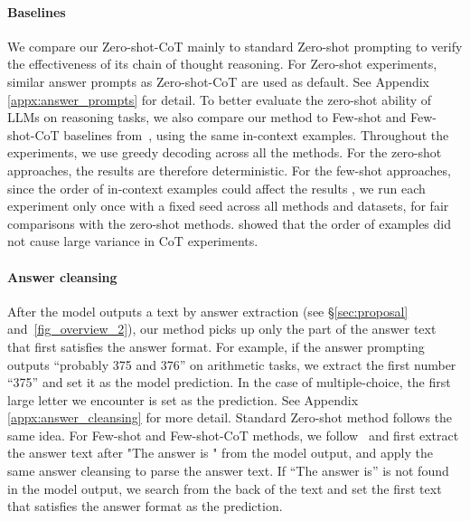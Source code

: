 \documentclass{article}
\newcommand{\kojima}[1]{{\color{red}[{#1} --TK]}}
\newcommand{\CoT}{chain of thought\xspace}
\newcommand{\ours}{Zero-shot-CoT\xspace}
\newcommand{\theirs}{Few-shot-CoT\xspace}
\newcommand{\theirsz}{Zero-shot\xspace}
\newcommand{\theirsf}{Few-shot\xspace}
\newcommand{\mysection}{\S\xspace}
\begin{document}
\paragraph{Baselines}
We compare our \ours mainly to standard \theirsz prompting to verify the effectiveness of its \CoT reasoning. For \theirsz experiments, similar answer prompts as \ours are used as default. See Appendix \ref{appx:answer_prompts} for detail.
To better evaluate the zero-shot ability of LLMs on reasoning tasks, we also compare our method to \theirsf and \theirs baselines from~\citep{cot_wei}, using the same in-context examples. 
Throughout the experiments, we use greedy decoding across all the methods. For the zero-shot approaches, the results are therefore deterministic. 
For the few-shot approaches, since the order of in-context examples could affect the results \citep{lu2021fantastically}, we run each experiment only once with a fixed seed across all methods and datasets, for fair comparisons with the zero-shot methods. 
\citet{cot_wei} showed that the order of examples did not cause large variance in CoT experiments. 


\paragraph{Answer cleansing} After the model outputs a text by answer extraction (see \mysection \ref{sec:proposal} and~\autoref{fig_overview_2}), our method picks up only the part of the answer text that first satisfies the answer format. 
For example, if the answer prompting outputs ``probably 375 and 376'' on arithmetic tasks, we extract the first number ``375'' and set it as the model prediction. 
In the case of multiple-choice, the first large letter we encounter is set as the prediction.
See Appendix \ref{appx:answer_cleansing} for more detail.
Standard \theirsz method follows the same idea. 
For \theirsf and \theirs methods, we follow~\citep{cot_wei_sc} and first extract the answer text after "The answer is " from the model output, and apply the same answer cleansing to parse the answer text. 
If ``The answer is'' is not found in the model output, we search from the back of the text and set the first text that satisfies the answer format as the prediction.
\end{document}
